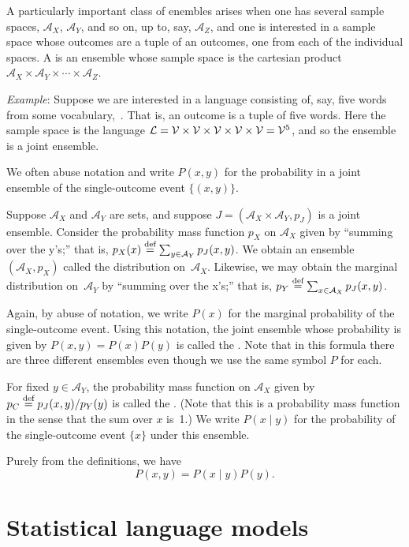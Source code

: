 \documentclass{article}
\begin{document}
A particularly important class of enembles arises when one has several sample spaces, $\mathcal{A}_X$, $\mathcal{A}_Y$, and so on, up to, say, $\mathcal{A}_Z$, and one is interested in a sample space whose outcomes are a tuple of an outcomes, one from each of the individual spaces.  A  is an ensemble whose sample space is the cartesian product $\mathcal{A}_X\times\mathcal{A}_Y\times\dotsb\times\mathcal{A}_Z$.

\emph{Example}: Suppose we are interested in a language consisting of, say, five words from some vocabulary,~\vocab.  That is, an outcome is a tuple of five words.  Here the sample space is the language $\mathcal{L} = \mathcal{V}\times\mathcal{V}\times\mathcal{V}\times\mathcal{V}\times\mathcal{V} = \mathcal{V}^5$, and so the ensemble is a joint ensemble.

We often abuse notation and write $P(x,y)$ for the probability in a
joint ensemble of the single-outcome event $\{(x,y)\}$.

Suppose $\mathcal{A}_X$ and $\mathcal{A}_Y$ are sets, and suppose $J = (\mathcal{A}_X\times\mathcal{A}_Y, p_J)$ is a joint ensemble. Consider the probability mass function $p_X$ on $\mathcal{A}_X$ given by ``summing over the y's;'' that is, $p_X(x) \stackrel{\text{def}}{=} \sum_{y\in\mathcal{A}_Y} p_J(x,y)$.  We obtain an ensemble $(\mathcal{A}_X, p_X)$ called the  distribution on~$\mathcal{A}_X$. Likewise, we may obtain the marginal distribution on~$\mathcal{A}_Y$ by ``summing over the x's;'' that is, $p_Y \stackrel{\text{def}}{=} \sum_{x\in\mathcal{A}_X} p_J(x,y)$.

Again, by abuse of notation, we write $P(x)$ for the marginal
probability of the single-outcome event. Using this notation, the joint
ensemble whose probability is given by $P(x,y)=P(x)P(y)$ is called the
. Note that in this formula there are three
different ensembles even though we use the same symbol $P$ for each.

For fixed $y\in\mathcal{A}_Y$, the probability mass function on $\mathcal{A}_X$ given by $p_C \stackrel{\text{def}}{=} p_J(x,y)/p_Y(y)$ is called the .  (Note that this is a probability mass function in the sense that the sum over $x$ is~1.) We write $P(x\mid y)$ for the probability of the single-outcome event $\{x\}$ under this ensemble.   

Purely from the definitions, we have
\begin{equation*}
  P(x,y) = P(x\mid y)P(y).
\end{equation*}


\section{Statistical language models}








\printbibheading
\printbibliography
\end{document}
